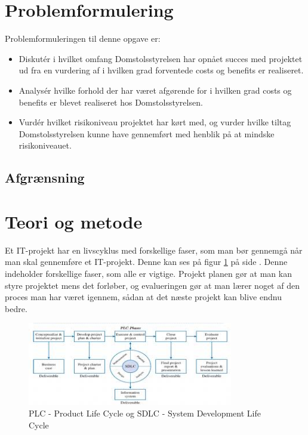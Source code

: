 \documentclass[10pt,a4paper,danish]{article}
\begin{document}
\section{Problemformulering}
Problemformuleringen til denne opgave er:
\begin{itemize}
\item Diskutér i hvilket omfang Domstolsstyrelsen har opnået succes med projektet ud fra en vurdering af i hvilken grad forventede costs og benefits er realiseret.
\item Analysér hvilke forhold der har været afgørende for i hvilken grad costs og benefits er blevet realiseret hos Domstolsstyrelsen.
\item Vurdér hvilket risikoniveau projektet har kørt med, og vurder hvilke tiltag Domstolsstyrelsen kunne have gennemført med henblik på at mindske risikoniveauet.
\end{itemize}

\subsection{Afgrænsning}




\section{Teori og metode}




Et IT-projekt har en livscyklus med forskellige faser, som man bør gennemgå når man skal gennemføre et IT-projekt. Denne kan ses på figur \ref{fig:SDLC} på side \pageref{fig:SDLC}. Denne indeholder forskellige faser, som alle er vigtige. Projekt planen gør at man kan styre projektet mens det forløber, og evalueringen gør at man lærer noget af den proces man har været igennem, sådan at det næste projekt kan blive endnu bedre.

\begin{figure}[h!]
    \centering
    \includegraphics[width=0.8\textwidth]{SDLC.jpg}
    \caption{PLC - Product Life Cycle og SDLC - System Development Life Cycle \cite[~s. 36]{Marchewka}}
    \label{fig:SDLC}
\end{figure}
\end{document}

